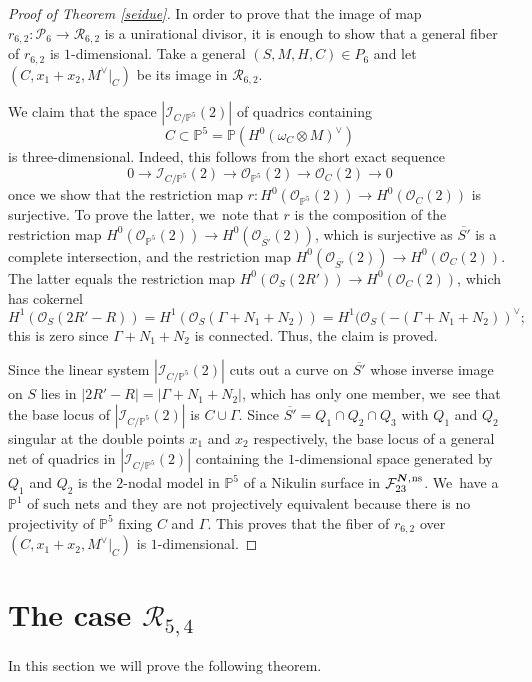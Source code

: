 \documentclass[11pt]{article}
\newcommand{\ns}{{\mkern1mu\mathrm{ns}}}
\newcommand{\bN}{\boldsymbol{N}}
\theoremstyle{plain}
\theoremstyle{definition}
\newcommand\PP{{\mathbb P}}
\newcommand\F{{\mathcal F}}
\newcommand\I{{\mathcal I}}
\renewcommand\O{{\mathcal O}}
\renewcommand\P{{\mathcal P}}
\newcommand\R{{\mathcal R}}
\begin{document}
\begin{proof}[Proof of Theorem \ref{seidue}]
In order to prove that the image of map $r_{6,2}:\P_{6}\to \mathcal R_{6,2}$ is a unirational divisor, it is enough to show that a general fiber of $r_{6,2}$ is $1$-dimensional. Take a general $(S,M,H,C)\in P_{6}$ and let $(C,x_1+x_2,M^\vee|_C)$ be its image in $\mathcal R_{6,2}$.

We claim that the space $|\I_{C/\PP^5}(2)|$ of quadrics containing\vspace*{-3pt}
\[
C\subset\PP^5=\PP(H^0(\omega_C\otimes M)^\vee)
\]
is three-dimensional. Indeed, this follows from the short exact sequence\vspace*{-3pt}
\[
0 \to \I_{C/\PP^5}(2) \to \O_{\PP^5}(2) \to \O_C(2) \to 0
\]
once we show that the restriction map $r:H^0( \O_{\PP^5}(2)) \to H^0(\O_C(2))$ is surjective.
To prove the latter, we~note that $r$ is the composition of the restriction map \linebreak $H^0( \O_{\PP^5}(2)) \to H^0(\O_{\overline{S'}}(2))$, which is surjective as $\overline{S'}$ is a complete intersection, and the restriction map $H^0(\O_{\overline{S'}}(2))\to H^0(\O_C(2))$. The latter equals the restriction map $H^0(\O_S(2R')) \to H^0(\O_C(2))$, which has cokernel\vspace*{-3pt}
\[
 H^1(\O_S(2R'-R))=H^1(\O_S(\Gamma+N_1+N_2))=H^1(\O_S(-(\Gamma+N_1+N_2))^{\vee};
\]
this is zero since $\Gamma+N_1+N_2$ is connected. Thus, the claim is proved.

Since the linear system $|\I_{C/\PP^5}(2)|$ cuts out a curve on $\overline{S'}$ whose inverse image on $S$ lies in $|2R'-R|=|\Gamma+N_1+N_2|$, which has only one member, we~see that the base locus of $|\I_{C/\PP^5}(2)|$ is $C\cup \Gamma$. Since $\overline{S'}=Q_1\cap Q_2\cap Q_3$ with $Q_1$ and $Q_2$ singular at the double points $x_1$ and $x_2$ respectively, the base locus of a general net of quadrics in $|\I_{C/\PP^5}(2)|$ containing the $1$-dimensional space generated by $Q_1$ and $Q_2$ is the $2$-nodal model in $\PP^5$ of a Nikulin surface in $\F_{23}^{\bN,\ns}$. We~have a $\PP^1$ of such nets and they are not projectively equivalent because there is no projectivity of $\PP^5$ fixing $C$ and $\Gamma$. This proves that the fiber of $r_{6,2}$ over $(C,x_1+x_2,M^\vee|_C)$ is $1$-dimensional.
\end{proof}

\section{The case \texorpdfstring{$\R_{5,4}$}{R}}
In this section we will prove the following theorem.
\end{document}
